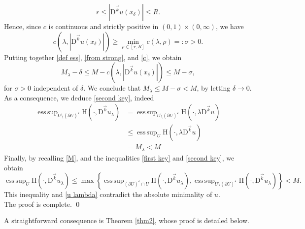\documentclass[a4paper,11pt]{article}
\numberwithin{equation}{section}
\newcommand{\eps}{\varepsilon}
\newcommand{\rom}{\mathrm}
\DeclareMathOperator*{\esssup}{ess\,sup}
\theoremstyle{definition}
\begin{document}
$$
r\leq| \mathrm D^{\vec{k}}u(x_\delta)|\leq R.
$$
Hence, since $c$ is continuous and strictly positive in $(0,1)\times(0,\infty)$, we have $$c(\lambda,| \mathrm D^{\vec{k}}u(x_\delta)|)\geq\min_{\rho\in[r,R]}c(\lambda,\rho)=:\sigma>0.$$
Putting together \eqref{def ess}, \eqref{from strong}, and \eqref{c}, we obtain
$$
M_\lambda-\delta\leq M-c(\lambda, |\mathrm D^{\vec{k}}u(x_\delta)|)\leq M-\sigma,
$$
for $\sigma>0$ independent of $\delta$. We conclude that $M_\lambda\leq M-\sigma<M$, by letting $\delta\to  0$.\\
As a consequence, we deduce \eqref{second key}, indeed
\begin{align*}
\esssup_{U\setminus (\partial U)^\eps}\rom{H}(\cdot, \mathrm D^{\vec{k}}u_\lambda)&=\esssup_{U\setminus (\partial U)^\eps}\rom{H}(\cdot, \lambda\mathrm D^{\vec{k}}u)\\
&\leq \esssup_{U}\rom{H}(\cdot, \lambda\mathrm D^{\vec{k}}u)\\
&=M_\lambda<M
\end{align*}
Finally, by recalling \eqref{M}, and the inequalities \eqref{first key} and \eqref{second key}, we obtain
$$
\esssup_{U}\rom{H}(\cdot, \mathrm D^{\vec{k}}u_\lambda)\leq \max\left\{\esssup_{(\partial U)^\eps\cap U}\rom{H}(\cdot, \mathrm D^{\vec{k}}u_\lambda), \esssup_{U\setminus (\partial U)^\eps}\rom{H}(\cdot, \mathrm D^{\vec{k}}u_\lambda)\right\}<M.
$$
This inequality and \eqref{u lambda} contradict the absolute minimality of $u$.\\
The proof is complete. \qed
\medskip

A straightforward consequence is Theorem \ref{thm2}, whose proof is detailed below.

\medskip
\end{document}
